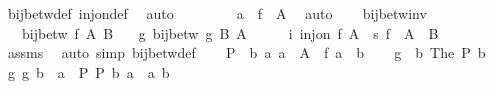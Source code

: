 \begin{isabellebody}
\ bij{\isacharunderscore}{\kern0pt}betw{\isacharunderscore}{\kern0pt}def\ inj{\isacharunderscore}{\kern0pt}on{\isacharunderscore}{\kern0pt}def\ \isamarkupfalse%
\ auto\isanewline
\ \ \ \ \isamarkupfalse%
\ {}\ \isamarkupfalse%
\ {\isachardoublequoteopen}a{\isacharprime}{\kern0pt}\ {\isasymin}\ f\ {\isacharbackquote}{\kern0pt}\ A{\isachardoublequoteclose}\ \isamarkupfalse%
\ auto\isanewline
\ \ \isamarkupfalse%
\isanewline
{}\isamarkupfalse%
%
\endisatagproof
{\isafoldproof}%
%
\isadelimproof
\isanewline
%
\endisadelimproof
\isanewline
{}\isamarkupfalse%
\ bij{\isacharunderscore}{\kern0pt}betw{\isacharunderscore}{\kern0pt}inv{\isacharcolon}{\kern0pt}\isanewline
\ \ \ {\isachardoublequoteopen}bij{\isacharunderscore}{\kern0pt}betw\ f\ A\ B{\isachardoublequoteclose}\isanewline
\ \ \ {\isachardoublequoteopen}{\isasymexists}g{\isachardot}{\kern0pt}\ bij{\isacharunderscore}{\kern0pt}betw\ g\ B\ A{\isachardoublequoteclose}\isanewline
%
\isadelimproof
%
\endisadelimproof
%
\isatagproof
{}\isamarkupfalse%
\ {\isacharminus}{\kern0pt}\isanewline
\ \ \isamarkupfalse%
\ i{\isacharcolon}{\kern0pt}\ {\isachardoublequoteopen}inj{\isacharunderscore}{\kern0pt}on\ f\ A{\isachardoublequoteclose}\ \ s{\isacharcolon}{\kern0pt}\ {\isachardoublequoteopen}f\ {\isacharbackquote}{\kern0pt}\ A\ {\isacharequal}{\kern0pt}\ B{\isachardoublequoteclose}\isanewline
\ \ \ \ \isamarkupfalse%
\ assms\ \isamarkupfalse%
\ {\isacharparenleft}{\kern0pt}auto\ simp{\isacharcolon}{\kern0pt}\ bij{\isacharunderscore}{\kern0pt}betw{\isacharunderscore}{\kern0pt}def{\isacharparenright}{\kern0pt}\isanewline
\ \ \isamarkupfalse%
\ {\isacharquery}{\kern0pt}P\ {\isacharequal}{\kern0pt}\ {\isachardoublequoteopen}{\isasymlambda}b\ a{\isachardot}{\kern0pt}\ a\ {\isasymin}\ A\ {\isasymand}\ f\ a\ {\isacharequal}{\kern0pt}\ b{\isachardoublequoteclose}\isanewline
\ \ \isamarkupfalse%
\ {\isacharquery}{\kern0pt}g\ {\isacharequal}{\kern0pt}\ {\isachardoublequoteopen}{\isasymlambda}b{\isachardot}{\kern0pt}\ The\ {\isacharparenleft}{\kern0pt}{\isacharquery}{\kern0pt}P\ b{\isacharparenright}{\kern0pt}{\isachardoublequoteclose}\isanewline
\ \ \isamarkupfalse%
\ g{\isacharcolon}{\kern0pt}\ {\isachardoublequoteopen}{\isacharquery}{\kern0pt}g\ b\ {\isacharequal}{\kern0pt}\ a{\isachardoublequoteclose}\ \ P{\isacharcolon}{\kern0pt}\ {\isachardoublequoteopen}{\isacharquery}{\kern0pt}P\ b\ a{\isachardoublequoteclose}\ \ a\ b\isanewline

\end{isabellebody}
